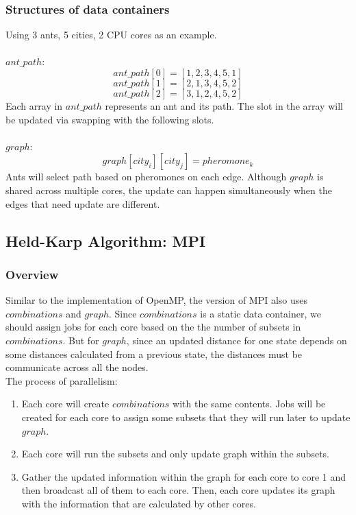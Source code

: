 \documentclass{article}
\begin{document}
\subsubsection{Structures of data containers}
    Using 3 ants, 5 cities, 2 CPU cores as an example.\\\\
    $ant\_path$:
        $$ant\_path[0] = [1, 2, 3, 4, 5, 1]$$
        $$ant\_path[1] = [2, 1, 3, 4, 5, 2]$$
        $$ant\_path[2] = [3, 1, 2, 4, 5, 2]$$
    Each array in $ant\_path$ represents an ant and its path. The slot in the array will be updated via swapping with the following slots.\\\\
    $graph$:
        $$graph[city_i][city_j] = pheromone_k$$
    Ants will select path based on pheromones on each edge. Although $graph$ is shared across multiple cores, the update can happen simultaneously when the edges that need update are different.


\subsection{Held-Karp Algorithm: MPI}
\subsubsection{Overview}
    Similar to the implementation of OpenMP, the version of MPI also uses $combinations$ and $graph$. Since $combinations$ is a static data container, we should assign jobs for each core based on the the number of subsets in $combinations$. But for $graph$, since an updated distance for one state depends on some distances calculated from a previous state, the distances must be communicate across all the nodes.\\
    The process of parallelism:
    \begin{enumerate}
        \item Each core will create $combinations$ with the same contents. Jobs will be created for each core to assign some subsets that they will run later to update $graph$.
        \item Each core will run the subsets and only update graph within the subsets.
        \item Gather the updated information within the graph for each core to core 1 and then broadcast all of them to each core. Then, each core updates its graph with the information that are calculated by other cores.
    \end{enumerate}
\end{document}
